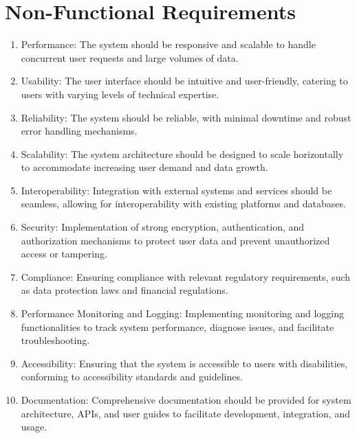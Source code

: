 \documentclass{article}
\begin{document}
\section{Non-Functional Requirements}
\begin{enumerate}[label=\arabic*.]
    \item Performance: The system should be responsive and scalable to handle concurrent user requests and large volumes of data.
    \item Usability: The user interface should be intuitive and user-friendly, catering to users with varying levels of technical expertise.
    \item Reliability: The system should be reliable, with minimal downtime and robust error handling mechanisms.
    \item Scalability: The system architecture should be designed to scale horizontally to accommodate increasing user demand and data growth.
    \item Interoperability: Integration with external systems and services should be seamless, allowing for interoperability with existing platforms and databases.
    \item Security: Implementation of strong encryption, authentication, and authorization mechanisms to protect user data and prevent unauthorized access or tampering.
    \item Compliance: Ensuring compliance with relevant regulatory requirements, such as data protection laws and financial regulations.
    \item Performance Monitoring and Logging: Implementing monitoring and logging functionalities to track system performance, diagnose issues, and facilitate troubleshooting.
    \item Accessibility: Ensuring that the system is accessible to users with disabilities, conforming to accessibility standards and guidelines.
    \item Documentation: Comprehensive documentation should be provided for system architecture, APIs, and user guides to facilitate development, integration, and usage.
\end{enumerate}
\end{document}
